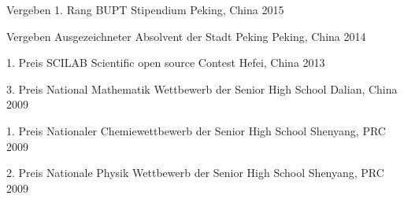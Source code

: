 \begin{cvhonors}







\cvhonor
{Vergeben} %
{1. Rang BUPT Stipendium} %
{Peking, China} %
{2015} %


\cvhonor
{Vergeben} %
{Ausgezeichneter Absolvent der Stadt Peking} %
{Peking, China} %
{2014} %



\cvhonor
{1. Preis} %
{SCILAB Scientific open source Contest} %
{Hefei, China} %
{2013} %


\cvhonor
{3. Preis} %
{National Mathematik Wettbewerb der Senior High School} %
{Dalian, China} %
{2009} %

\cvhonor
{1. Preis} %
{Nationaler Chemiewettbewerb der Senior High School} %
{Shenyang, PRC} %
{2009} %

\cvhonor
{2. Preis} %
{Nationale Physik Wettbewerb der Senior High School} %
{Shenyang, PRC} %
{2009} %


\end{cvhonors}
